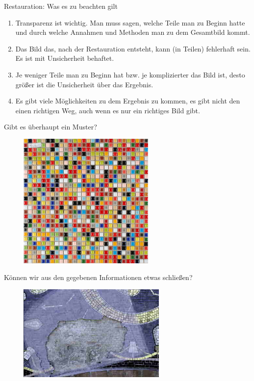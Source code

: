 \documentclass[usenames,dvipsnames,handout]{beamer}
\begin{document}
\begin{frame}{Restauration: Was es zu beachten gilt}
\begin{enumerate}
\item{Transparenz ist wichtig. Man muss sagen, welche Teile man zu Beginn hatte und durch welche 
Annahmen und Methoden man zu dem Gesamtbild kommt.}\pause
\item{Das Bild das, nach der Restauration entsteht, kann (in Teilen) fehlerhaft sein. Es ist mit Unsicherheit behaftet.}\pause
\item{Je weniger Teile man zu Beginn hat bzw. je komplizierter das Bild ist, desto größer ist die Unsicherheit über das Ergebnis.}\pause
\item{Es gibt  viele Möglichkeiten zu dem Ergebnis zu kommen, es gibt nicht den einen richtigen Weg,
auch wenn es nur ein richtiges Bild gibt.}\pause
\end{enumerate}
\end{frame}

\begin{frame}{Gibt es überhaupt ein Muster?}
     \begin{figure}[ht]
 	\centering
 	      \includegraphics[width=0.6\textwidth]{pattern.jpg}
 	\end{figure}
\end{frame}

\begin{frame}{Können wir aus den gegebenen Informationen etwas schließen?}
     \begin{figure}[ht]
 	\centering
 	      \includegraphics[width=0.65\textwidth]{incomplete2.jpg}
 	\end{figure}
\end{frame}
\end{document}
